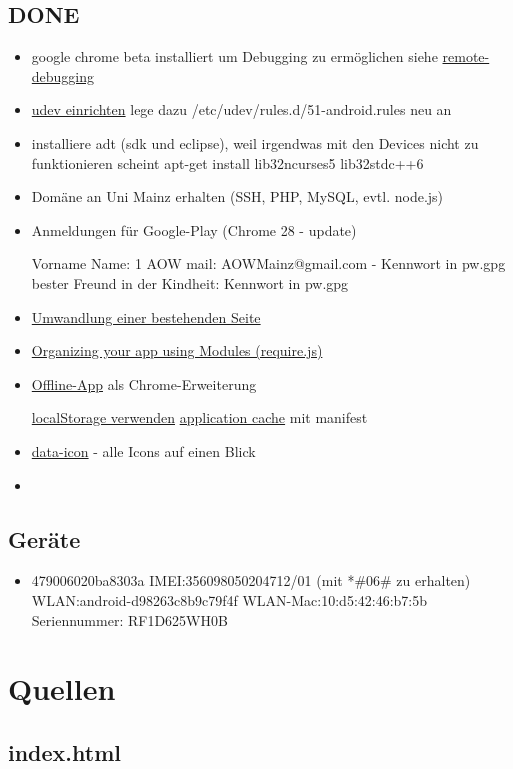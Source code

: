 \documentclass[a4paper]{scrartcl}
\begin{document}
		\subsection{DONE}
			\begin{itemize}
				\item google chrome beta installiert um Debugging zu ermöglichen siehe \href{https://developers.google.com/chrome-developer-tools/docs/remote-debugging}{remote-debugging}
				\item \href{http://developer.android.com/tools/device.html#setting-up}{udev einrichten} lege dazu /etc/udev/rules.d/51-android.rules neu an
				\item installiere adt (sdk und eclipse), weil irgendwas mit den Devices nicht zu funktionieren scheint \newline apt-get install lib32ncurses5 lib32stdc++6
				\item Domäne an Uni Mainz erhalten (SSH, PHP, MySQL, evtl. node.js)
				\item Anmeldungen für Google-Play (Chrome 28 - update)

					Vorname Name: 1 AOW \newline
					mail: AOWMainz@gmail.com - Kennwort in pw.gpg \newline
					bester Freund in der Kindheit: Kennwort in pw.gpg
				\item \href{http://www.ofbrooklyn.com/2012/11/13/backbonification-migrating-javascript-to-backbone}{Umwandlung einer bestehenden Seite}
				\item \href{http://backbonetutorials.com/organizing-backbone-using-modules/}{Organizing your app using Modules (require.js)}
				\item \href{http://developer.chrome.com/apps/about_apps.html}{Offline-App} als Chrome-Erweiterung
					
					\href{http://docs.webplatform.org/wiki/tutorials/offline_storage}{localStorage verwenden}\newline
					\href{http://docs.webplatform.org/wiki/tutorials/appcache_beginner}{application cache} mit manifest
				\item \href{http://jquerymobile.com/demos/1.3.0-rc.1/docs/lists/lists-themes.html}{data-icon} - alle Icons auf einen Blick
				\item 
			\end{itemize}
		\subsection{Geräte}
			\begin{itemize}
				\item 479006020ba8303a \newline
					IMEI:356098050204712/01 (mit *\#06\# zu erhalten) \newline
					WLAN:android-d98263c8b9c79f4f \newline
					WLAN-Mac:10:d5:42:46:b7:5b \newline
					Seriennummer: RF1D625WH0B

			\end{itemize}
		\section{Quellen}
			\subsection{index.html}
				
\end{document}

